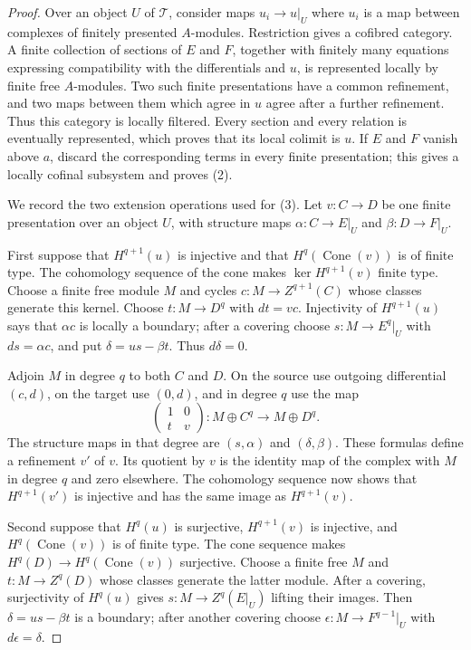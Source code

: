\begin{proof}
Over an object $U$ of $\mathcal{T}$, consider maps $u_i \to u|_U$ where
$u_i$ is a map between complexes of finitely presented $A$-modules.
Restriction gives a cofibred category. A finite collection of sections of
$E$ and $F$, together with finitely many equations expressing compatibility
with the differentials and $u$, is represented locally by finite free
$A$-modules. Two such finite presentations have a common refinement, and
two maps between them which agree in $u$ agree after a further refinement.
Thus this category is locally filtered. Every section and every relation is
eventually represented, which proves that its local colimit is $u$. If
$E$ and $F$ vanish above $a$, discard the corresponding terms in every
finite presentation; this gives a locally cofinal subsystem and proves (2).

We record the two extension operations used for (3). Let
$v : C \to D$ be one finite presentation over an object $U$, with structure
maps $\alpha : C \to E|_U$ and $\beta : D \to F|_U$.

First suppose that $H^{q + 1}(u)$ is injective and that
$H^q(\operatorname{Cone}(v))$ is of finite type. The cohomology sequence of
the cone makes $\ker H^{q + 1}(v)$ finite type. Choose a finite free module
$M$ and cycles $c : M \to Z^{q + 1}(C)$ whose classes generate this kernel.
Choose $t : M \to D^q$ with $d t = v c$. Injectivity of
$H^{q + 1}(u)$ says that $\alpha c$ is locally a boundary; after a covering
choose $s : M \to E^q|_U$ with $d s = \alpha c$, and put
$\delta = u s - \beta t$. Thus $d\delta = 0$.

Adjoin $M$ in degree $q$ to both $C$ and $D$. On the source use outgoing
differential $(c,d)$, on the target use $(0,d)$, and in degree $q$ use the
map
$$
\begin{pmatrix}1&0\\ t&v\end{pmatrix} :
M \oplus C^q \longrightarrow M \oplus D^q.
$$
The structure maps in that degree are $(s,\alpha)$ and $(\delta,\beta)$.
These formulas define a refinement $v'$ of $v$. Its quotient by $v$ is the
identity map of the complex with $M$ in degree $q$ and zero elsewhere.
The cohomology sequence now shows that $H^{q + 1}(v')$ is injective and has
the same image as $H^{q + 1}(v)$.

Second suppose that $H^q(u)$ is surjective, $H^{q + 1}(v)$ is injective,
and $H^q(\operatorname{Cone}(v))$ is of finite type. The cone sequence
makes $H^q(D) \to H^q(\operatorname{Cone}(v))$ surjective. Choose a finite
free $M$ and $t : M \to Z^q(D)$ whose classes generate the latter module.
After a covering, surjectivity of $H^q(u)$ gives
$s : M \to Z^q(E|_U)$ lifting their images. Then
$\delta = u s - \beta t$ is a boundary; after another covering choose
$\epsilon : M \to F^{q - 1}|_U$ with $d\epsilon = \delta$.


\end{proof}
